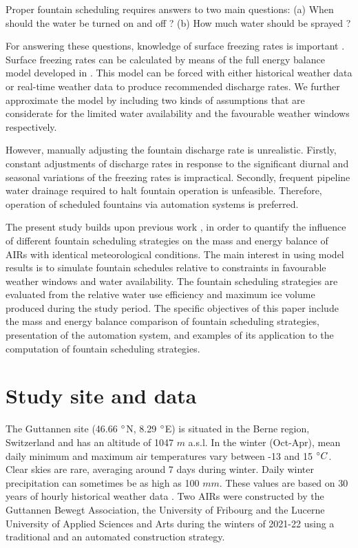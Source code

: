 \documentclass[tc, manuscript]{copernicus}
\begin{document}
Proper fountain scheduling requires answers to two main questions: 
(a) When should the water be turned on and off ?
(b) How much water should be sprayed ? 

For answering these questions, knowledge of surface freezing rates is important . Surface freezing rates can be
calculated by means of the full energy balance model developed in
\cite{balasubramanianInfluenceMeteorologicalConditions2022}. This model can be forced with either historical
weather data or real-time weather data to produce recommended discharge rates. We further approximate the model
by including two kinds of assumptions that are considerate for the limited water availability and the favourable
weather windows respectively.

However, manually adjusting the fountain discharge rate is unrealistic. Firstly, constant adjustments of
discharge rates in response to the significant diurnal and seasonal variations of the freezing rates is
impractical. Secondly, frequent pipeline water drainage required to halt fountain operation is unfeasible.
Therefore, operation of scheduled fountains via automation systems is preferred.

The present study builds upon previous work \citep{balasubramanianInfluenceMeteorologicalConditions2022,
oerlemansBriefCommunicationGrowth2021}, in order to quantify the influence of different fountain scheduling
strategies on the mass and energy balance of AIRs with identical meteorological conditions. The main interest in
using model results is to simulate fountain schedules relative to constraints in favourable weather windows and
water availability. The fountain scheduling strategies are evaluated from the relative water use efficiency and
maximum ice volume produced during the study period. The specific objectives of this paper include the mass and
energy balance comparison of fountain scheduling strategies, presentation of the automation system, and examples
of its application to the computation of fountain scheduling strategies.

\section{Study site and data}

The Guttannen site (46.66 $^{\circ}$N, 8.29 $^{\circ}$E) is situated in the Berne region, Switzerland and has an
altitude of 1047 $m$ a.s.l. In the winter (Oct-Apr), mean daily minimum and maximum air temperatures vary
between -13 and 15 $^{\circ} C$. Clear skies are rare, averaging around 7 days during winter. Daily winter
precipitation can sometimes be as high as 100 $mm$. These values are based on 30 years of hourly historical
weather data \citep{meteoblueClimateGuttannen}. Two AIRs were constructed by the Guttannen Bewegt Association,
the University of Fribourg and the Lucerne University of Applied Sciences and Arts during the winters of 2021-22
using a traditional and an automated construction strategy.
\end{document}
